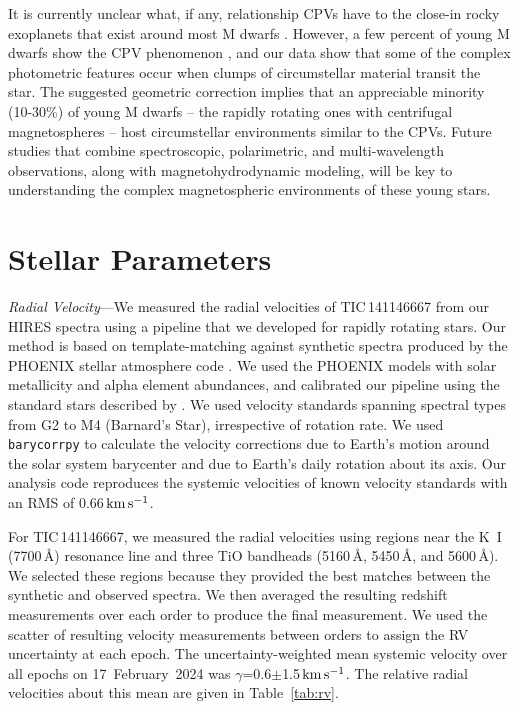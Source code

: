 \documentclass[11pt,twocolumn,tighten,linenumbers]{aastex7}
\newcommand{\kms}{\ensuremath{\rm km\,s^{-1}}}
\begin{document}
It is currently unclear what, if any, relationship CPVs have to the
close-in rocky exoplanets that exist around most M dwarfs
\citep{Dressing2015}.  However, a few percent of young M dwarfs show
the CPV phenomenon \citep{Rebull2020}, and our data show that some of
the complex photometric features occur when clumps of circumstellar
material transit the star.  The suggested geometric correction implies
that an appreciable minority (10-30\%) of young M dwarfs -- the
rapidly rotating ones with centrifugal magnetospheres -- host
circumstellar environments similar to the CPVs.  Future studies that
combine spectroscopic, polarimetric, and multi-wavelength
observations, along with magnetohydrodynamic modeling, will be key to
understanding the complex magnetospheric environments of these young
stars.




\appendix

\section{Stellar Parameters}
\label{sec:stparams}

{\it Radial Velocity}---We measured the radial velocities of
TIC\,141146667 from our HIRES spectra using a pipeline that we
developed for rapidly rotating stars.  Our method is based on
template-matching against synthetic spectra produced by the PHOENIX
stellar atmosphere code \citep{Husser2013}.  We used the PHOENIX models
with solar metallicity and alpha element abundances, and calibrated
our pipeline using the standard stars described by \citet{Chubak2012}.
We used velocity standards spanning spectral types from G2 to M4
(Barnard's Star), irrespective of rotation rate.  We used
\texttt{barycorrpy} \citep{Kanodia2018} to calculate the velocity
corrections due to Earth's motion around the solar system barycenter
and due to Earth's daily rotation about its axis.  Our analysis code
reproduces the systemic velocities of known velocity standards
\citep{Chubak2012} with an RMS of 0.66\,\kms.

For TIC\,141146667, we measured the radial velocities using regions
near the K~I (7700\,\AA) resonance line and three TiO bandheads
(5160\,\AA, 5450\,\AA, and 5600\,\AA).  We selected these regions
because they provided the best matches between the synthetic and
observed spectra.  We then averaged the resulting redshift
measurements over each order to produce the final measurement.  We
used the scatter of resulting velocity measurements between orders to
assign the RV uncertainty at each epoch.  The uncertainty-weighted
mean systemic velocity over all epochs on 17~February~2024 was
$\gamma$=0.6$\pm$1.5\,\kms.  The relative radial velocities about this
mean are given in Table~\ref{tab:rv}.
\end{document}
